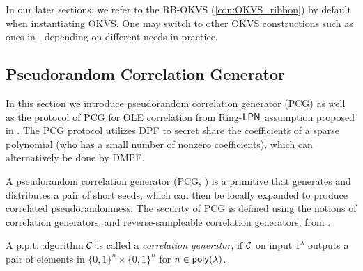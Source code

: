 In our later sections, we refer to the RB-OKVS (\cref{con:OKVS_ribbon}) by default when instantiating OKVS. One may switch to other OKVS constructions such as ones in \cite{cryptoeprint:2021/883,cryptoeprint:2022/320}, depending on different needs in practice. 

\subsection{Pseudorandom Correlation Generator}\label{sec:PCG_prelim}
In this section we introduce pseudorandom correlation generator (PCG) as well as the protocol of PCG for OLE correlation from Ring-${\sf LPN}$ assumption proposed in \cite{cryptoeprint:2022/1035}. The PCG protocol utilizes DPF to secret share the coefficients of a sparse polynomial (who has a small number of nonzero coefficients), which can alternatively be done by DMPF. 

A pseudorandom correlation generator (PCG, \cite{cryptoeprint:2019/273,cryptoeprint:2019/448}) is a primitive that generates and distributes a pair of short seeds, which can then be locally expanded to produce correlated pseudorandomness. The security of PCG is defined using the notions of correlation generators, and reverse-sampleable correlation generators, from \cite{cryptoeprint:2019/448}. 

\begin{definition}\label{def:correlation_generator}A p.p.t. algorithm $\mathcal{C}$ is called a \emph{correlation generator}, if $\mathcal{C}$ on input $1^\lambda$ outputs a pair of elements in $\{0, 1\}^n \times \{0, 1\}^n$ for $n \in {\sf poly}(\lambda)$. 
\end{definition} 

